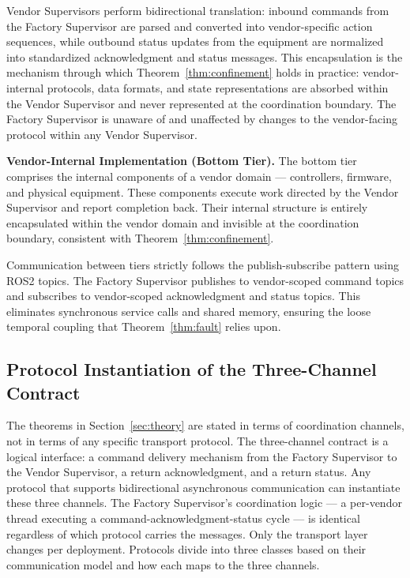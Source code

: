 \documentclass[a4paper,fleqn]{cas-dc}
\begin{document}

Vendor Supervisors perform bidirectional translation: inbound commands from the Factory Supervisor are parsed and converted into vendor-specific action sequences, while outbound status updates from the equipment are normalized into standardized acknowledgment and status messages. This encapsulation is the mechanism through which Theorem~\ref{thm:confinement} holds in practice: vendor-internal protocols, data formats, and state representations are absorbed within the Vendor Supervisor and never represented at the coordination boundary. The Factory Supervisor is unaware of and unaffected by changes to the vendor-facing protocol within any Vendor Supervisor.

\textbf{Vendor-Internal Implementation (Bottom Tier).} The bottom tier comprises the internal components of a vendor domain — controllers, firmware, and physical equipment. These components execute work directed by the Vendor Supervisor and report completion back. Their internal structure is entirely encapsulated within the vendor domain and invisible at the coordination boundary, consistent with Theorem~\ref{thm:confinement}.

Communication between tiers strictly follows the publish-subscribe pattern using ROS2 topics. The Factory Supervisor publishes to vendor-scoped command topics and subscribes to vendor-scoped acknowledgment and status topics. This eliminates synchronous service calls and shared memory, ensuring the loose temporal coupling that Theorem~\ref{thm:fault} relies upon.

\subsection{Protocol Instantiation of the Three-Channel Contract}
\label{sec:protocol_instantiation}

The theorems in Section~\ref{sec:theory} are stated in terms of coordination channels, not in terms of any specific transport protocol. The three-channel contract is a logical interface: a command delivery mechanism from the Factory Supervisor to the Vendor Supervisor, a return acknowledgment, and a return status. Any protocol that supports bidirectional asynchronous communication can instantiate these three channels. The Factory Supervisor's coordination logic — a per-vendor thread executing a command-acknowledgment-status cycle — is identical regardless of which protocol carries the messages. Only the transport layer changes per deployment. Protocols divide into three classes based on their communication model and how each maps to the three channels.
\end{document}
